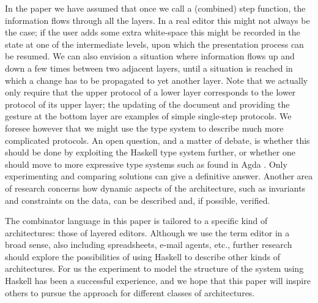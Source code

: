 \documentclass{llncs}
\begin{document}
In the paper we have assumed that once we call a (combined) step function, the information flows through all the layers. In a real editor this might not always be the case; if the user adds some extra white-space this might be recorded in the state at one of the intermediate levels, upon which the presentation process can be resumed. We can also envision a situation where information flows up and down a few times between two adjacent layers, until a situation is reached in which a change has to be propagated to yet another layer. Note that we actually only require that the upper protocol of a lower layer corresponds to the lower protocol of its upper layer; the updating of the document and providing the gesture at the bottom layer are examples of simple single-step protocols. We foresee however that we might use the type system to describe much more complicated protocols. An open question, and a matter of debate, is whether this should be done by exploiting the Haskell type system further, or whether one should move to more expressive type systems such as found in Agda \cite{norell:thesis}. Only experimenting and comparing solutions can give a definitive answer. Another area of research concerns how dynamic aspects of the architecture, such as invariants and constraints on the data, can be described and, if possible, verified.

The combinator language in this paper is tailored to a specific kind of architectures: those of layered editors. Although we use the term editor in a broad sense, also including spreadsheets, e-mail agents, etc., further research should explore the possibilities of using Haskell to describe other kinds of architectures. For us the experiment to model the structure of the system using Haskell has been a successful experience, and we hope that this paper will inspire others to pursue the approach for different classes of architectures.  



\end{document}
